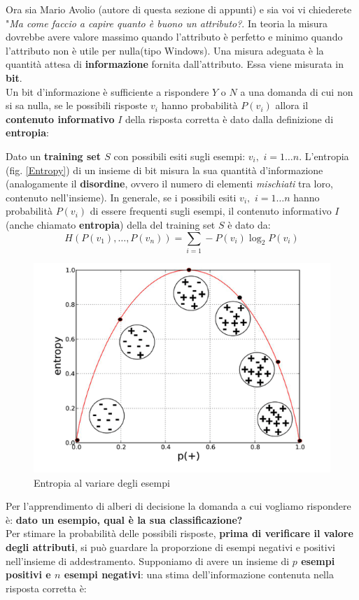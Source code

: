 Ora sia Mario Avolio (autore di questa sezione di appunti) e sia voi vi chiederete "\textit{Ma come faccio a capire quanto è buono un attributo?}. In teoria la misura dovrebbe avere valore massimo quando l'attributo è perfetto e minimo quando l'attributo non è utile per nulla(tipo Windows). Una misura adeguata è la quantità attesa di \textbf{informazione} fornita dall'attributo. Essa viene misurata in \textbf{bit}. \\ Un bit d'informazione è sufficiente a rispondere $Y$ o $N$ a una domanda di cui non si sa nulla, se le possibili risposte $v_i$ hanno probabilità $P(v_i)$ allora il \textbf{contenuto informativo} $I$ della risposta corretta è dato dalla definizione di \textbf{entropia}:
\begin{definizione}
  Dato un \textbf{training set $S$} con possibili esiti sugli esempi: $v_i,\,\, i=1\ldots n$. L'entropia (fig. \ref{Entropy}) di un
  insieme di bit misura la sua quantità d'informazione (analogamente il \textbf{disordine}, ovvero il numero di elementi \textit{mischiati} tra loro, contenuto nell'insieme). In generale, se i possibili esiti $v_i,\,\, i=1\ldots n$ hanno probabilità $P(v_i)$ di essere frequenti sugli esempi, il contenuto informativo $I$ (anche chiamato \textbf{entropia}) della del training set $S$ è dato da:
  \begin{equation}
  H(P(v_1),\ldots, P(v_n))=\sum_{i=1}-P(v_i)\log_2P(v_i)
      \label{Entropy}
\end{equation}
  \end{definizione}
  \begin{figure}[H]
      \centering
      \includegraphics[width=1\textwidth]{img/entropy.png}
      \caption{Entropia al variare degli esempi \cite{}}
  \end{figure}
    Per l'apprendimento di alberi di decisione la domanda a cui vogliamo rispondere è: \textbf{dato un esempio, qual è la sua classificazione?}\\
      Per stimare la probabilità delle possibili risposte, \textbf{prima di verificare il valore degli attributi}, si può guardare la proporzione di esempi negativi e positivi nell'insieme di addestramento. Supponiamo di avere un insieme di \textbf{$p$ esempi positivi e $n$ esempi negativi}: una stima dell'informazione contenuta nella risposta corretta è:
    
